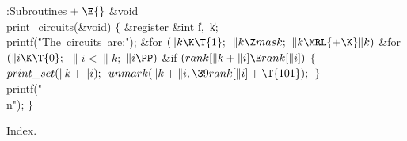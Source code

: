 \B{}:Subroutines\X${}\mathrel+\E{}$\6
\&{void} \\{print\_circuits}(\&{void})\1\1\2\2\6
${}\{{}$\1\6
\&{register} \&{int} \|i${},{}$ \|k;\7
\\{printf}(\.{"The\ circuits\ are:"});\6
\&{for} ${}(\|k\K\T{1};{}$ ${}\|k\Z\\{mask};{}$ ${}\|k\MRL{+{\K}}\|k){}$\1\6
\&{for} ${}(\|i\K\T{0};{}$ ${}\|i<\|k;{}$ ${}\|i\PP){}$\1\6
\&{if} ${}(\\{rank}[\|k+\|i]\E\\{rank}[\|i]){}$\5
${}\{{}$\1\6
${}\\{print\_set}(\|k+\|i);{}$\6
${}\\{unmark}(\|k+\|i,\39\\{rank}[\|i]+\T{101});{}$\6
\4${}\}{}$\2\2\2\6
\\{printf}(\.{"\\n"});\6
\4${}\}{}$\2\par
\fi

Index.

\fi


\inx
\fin
\con
